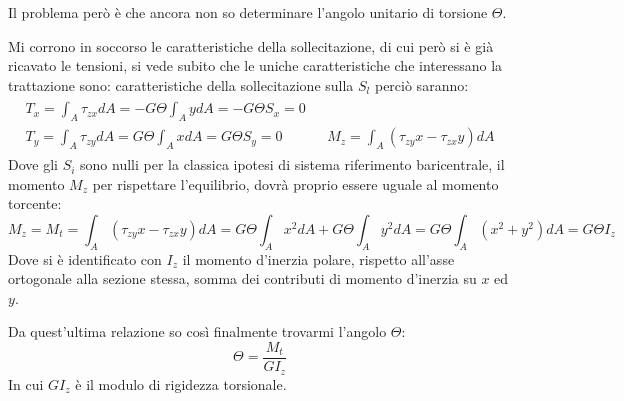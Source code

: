 			Il problema però è che ancora non so determinare l'angolo unitario di torsione $\Theta$. 
			
			Mi corrono in soccorso le caratteristiche della sollecitazione, di cui però si è già ricavato le tensioni, si vede subito che le uniche caratteristiche che interessano la trattazione sono: 
			caratteristiche della sollecitazione sulla $S_l$ perciò saranno:
			\[\begin{matrix}
				\begin{aligned}
					T_x = \int_A \tau_{zx}dA = -G\Theta\int_AydA = -G\Theta S_x = 0 &  \\
					T_y = \int_A \tau_{zy}dA = G\Theta\int_AxdA = G\Theta S_y =0 \hspace{1cm} &  M_z = \int_A (\tau_{zy}x -\tau_{zx}y)dA
				\end{aligned}	
			\end{matrix}\]
			Dove gli $S_i$ sono nulli per la classica ipotesi di sistema riferimento baricentrale, il momento $M_z$ per rispettare l'equilibrio, dovrà proprio essere uguale al momento torcente:
			\[ M_z = M_t = \int_A (\tau_{zy}x -\tau_{zx}y)dA = G\Theta\int_Ax^2dA + G\Theta\int_Ay^2dA = G\Theta\int_A(x^2 + y^2)dA = G\Theta I_z \]
			Dove si è identificato con $I_z$ il momento d'inerzia polare, rispetto all'asse ortogonale alla sezione stessa, somma dei contributi di momento d'inerzia su $x$ ed $y$. \newline
			
			Da quest'ultima relazione so così finalmente trovarmi l'angolo $\Theta$: 
			\[ \Theta = \dfrac{M_t}{GI_z}\]
			In cui $GI_z$ è il modulo di rigidezza torsionale. \newline 
			
